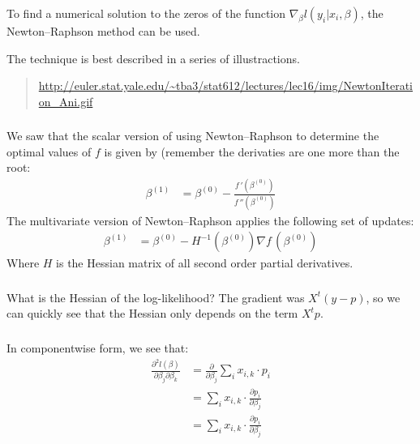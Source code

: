 \begin{frame}[fragile] \frametitle{}

To find a numerical solution to the zeros of the function
$\nabla_\beta l(y_i | x_i, \beta)$, the Newton–Raphson method
can be used.

\pause The technique is best described in a series of
illustractions.
\begin{quote}
\url{http://euler.stat.yale.edu/~tba3/stat612/lectures/lec16/img/NewtonIteration_Ani.gif}
\end{quote}

\end{frame}

\begin{frame}[fragile] \frametitle{}

We saw that the scalar version of using Newton–Raphson to determine
the optimal values of $f$ is given by (remember the derivaties are
one more than the root:
\begin{align*}
\beta^{(1)} &= \beta^{(0)} - \frac{f\,'(\beta^{(0)})}{f\,''(\beta^{(0)})}
\end{align*}
\pause The multivariate version of Newton–Raphson applies the following
set of updates:
\begin{align*}
\beta^{(1)} &= \beta^{(0)} - H^{-1}(\beta^{(0)}) \nabla f\,(\beta^{(0)})
\end{align*}
Where $H$ is the Hessian matrix of all second order partial derivatives.

\end{frame}



\begin{frame}[fragile] \frametitle{}

What is the Hessian of the log-likelihood? The gradient
was $X^t (y - p)$, so we can quickly see that the
Hessian only depends on the term $X^t p$.

\end{frame}

\begin{frame}[fragile] \frametitle{}

In componentwise form, we see that:
\begin{align*}
\frac{\partial^2 l(\beta)}{\partial \beta_j \partial \beta_k}
&= \frac{\partial}{\partial \beta_j} \sum_i x_{i,k} \cdot p_i \\
&= \sum_i x_{i,k} \cdot \frac{\partial p_i}{\partial \beta_j} \\
&= \sum_i x_{i,k} \cdot \frac{\partial p_i}{\partial \beta_j} \\
\end{align*}

\end{frame}


